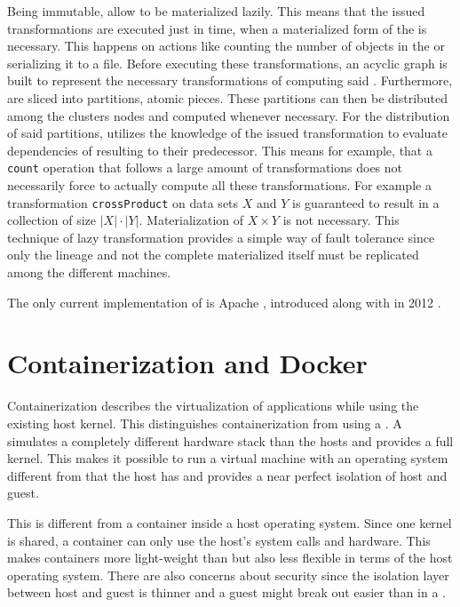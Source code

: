 Being immutable, \rdds{} allow to be materialized lazily. This means that the issued transformations are executed just in time, when a materialized form of the \rdd{} is necessary. This happens on actions like counting the number of objects in the \rdd{} or serializing it to a file. Before executing these transformations, an acyclic graph is built to represent the necessary transformations of computing said \rdd{}. Furthermore, \rdds{} are sliced into partitions, atomic pieces. These partitions can then be distributed among the clusters nodes and computed whenever necessary. For the distribution of said partitions, \spark{} utilizes the knowledge of the issued transformation to evaluate dependencies of resulting \rdds{} to their predecessor. This means for example, that a \lstinline|count| operation that follows a large amount of transformations does not necessarily force \spark{} to actually compute all these transformations. For example a transformation \lstinline|crossProduct| on data sets $X$ and $Y$ is guaranteed to result in a collection of size $|X|\cdot{}|Y|$. Materialization of $X\times{}Y$ is not necessary. This technique of lazy transformation provides a simple way of fault tolerance since only the \rdd{} lineage and not the complete materialized \rdd{} itself must be replicated among the different machines.

The only current implementation of \rdds{} is Apache \spark{}, introduced along with \rdds{} in 2012 \cite{zaharia2012resilient}.

\section{Containerization and Docker}
Containerization describes the virtualization of applications while using the existing host kernel. This distinguishes containerization from using a \vm{}. A \vm{} simulates a completely different hardware stack than the hosts and provides a full kernel. This makes it possible to run a virtual machine with an operating system different from that the host has and provides a near perfect isolation of host and guest.

This is different from a container inside a host operating system. Since one kernel is shared, a container can only use the host's system calls and hardware. This makes containers more light-weight than \vms{} but also less flexible in terms of the host operating system. There are also concerns about security since the isolation layer between host and guest is thinner and a guest might break out easier than in a \vm{} \cite{turnbull2014docker,jian2017defense}.

